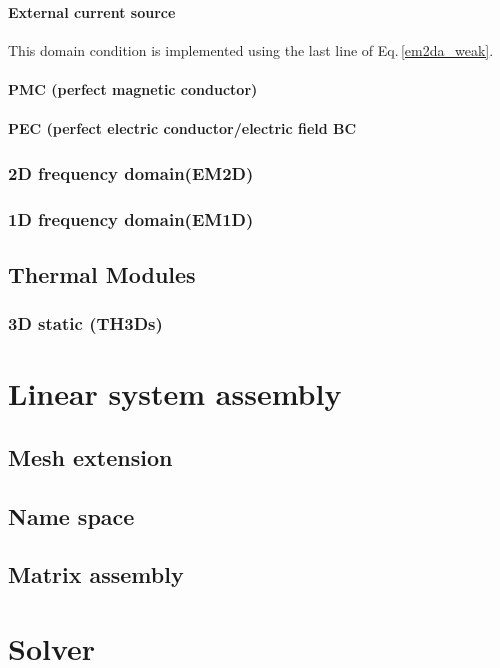 \documentclass[11pt,a4paper,draft]{report}
\begin{document}
 \subsubsection{External current source}
 This domain condition is implemented using the last line of Eq.\,\ref{em2da_weak}. 
 
 \subsubsection{PMC (perfect magnetic conductor)}
 
 \subsubsection{PEC (perfect electric conductor/electric field BC}
  
\subsection{2D frequency domain(EM2D)}

\subsection{1D frequency domain(EM1D)}


\section{Thermal Modules}
\subsection{3D static (TH3Ds)}


\chapter{Linear system assembly}
\section{Mesh extension} 
\section{Name space}
\section{Matrix assembly}

\chapter{Solver}
\end{document}
